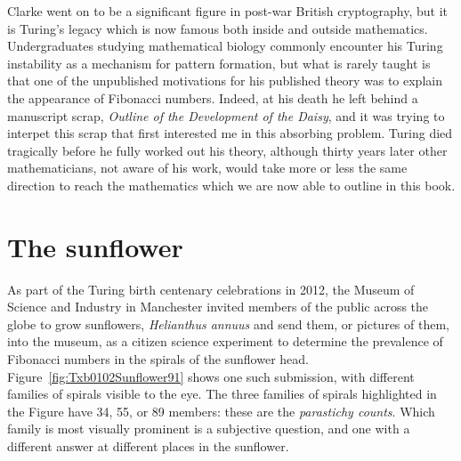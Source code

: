 Clarke went on to be a significant figure in post-war British cryptography, but it is Turing's legacy which is now famous both inside and outside mathematics.
Undergraduates studying mathematical biology commonly encounter his Turing instability as a mechanism for pattern formation, but what is  rarely  taught is that one of the unpublished motivations for his published theory was to explain the appearance of Fibonacci numbers. Indeed, at his death he left behind a manuscript scrap, \textit{Outline of the Development of the Daisy}, and it was trying to interpet this scrap that first interested me in this absorbing problem. Turing died tragically before he fully worked out his theory, although thirty years later other mathematicians, not aware of his work, would take more or less the same direction to reach the mathematics which we are now able to outline in this book. 


\section{The sunflower}

As part of the Turing birth centenary celebrations in 2012, the Museum of Science and Industry in Manchester invited members of the public across the globe to grow sunflowers, \textit{Helianthus annuus} and send them, or pictures of them, into the museum, as a citizen science experiment to determine the prevalence of Fibonacci numbers in the spirals of the sunflower head. Figure~\ref{fig:Txb0102Sunflower91} shows one such submission, with different families of spirals visible to the eye.  
The three families of spirals highlighted in the Figure have 34, 55, or 89 members: these are the \textit{parastichy counts}.
Which family is most visually prominent is a subjective question, and one with a different answer at different places in the sunflower. 

